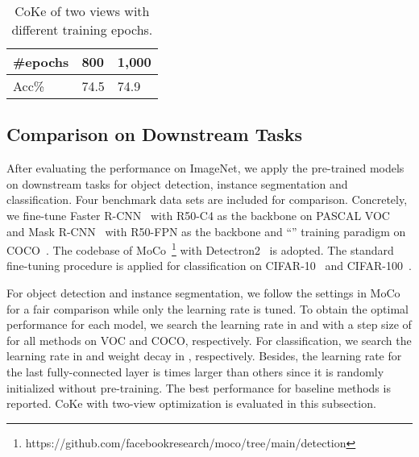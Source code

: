 \documentclass[10pt,twocolumn,letterpaper]{article}
\begin{document}
\begin{table}[!ht]
\centering
\begin{tabular}{|l|l|l|}\hline
\#epochs&800&1,000\\\hline
Acc\% &74.5&74.9\\\hline
\end{tabular}
\caption{CoKe of two views with different training epochs.}\label{tas:long}
\end{table}

\subsection{Comparison on Downstream Tasks}

After evaluating the performance on ImageNet, we apply the pre-trained models on downstream tasks for object detection, instance segmentation and classification. Four benchmark data sets are included for comparison. Concretely, we fine-tune Faster R-CNN~\cite{RenHG017} with R50-C4 as the backbone on PASCAL VOC~\cite{EveringhamGWWZ10} and Mask R-CNN~\cite{HeGDG17} with R50-FPN as the backbone and ``'' training paradigm on COCO~\cite{LinMBHPRDZ14}. The codebase of MoCo~\footnote{https://github.com/facebookresearch/moco/tree/main/detection} with Detectron2~\cite{wu2019detectron2} is adopted. The standard fine-tuning procedure is applied for classification on CIFAR-10~\cite{krizhevsky2009learning} and CIFAR-100~\cite{krizhevsky2009learning}.



For object detection and instance segmentation, we follow the settings in MoCo~\cite{He0WXG20} for a fair comparison while only the learning rate is tuned. To obtain the optimal performance for each model, we search the learning rate in  and  with a step size of  for all methods on VOC and COCO, respectively. For classification, we search the learning rate in  and weight decay in , respectively. Besides, the learning rate for the last fully-connected layer is  times larger than others since it is randomly initialized without pre-training. The best performance for baseline methods is reported. CoKe with two-view optimization is evaluated in this subsection.
\end{document}
